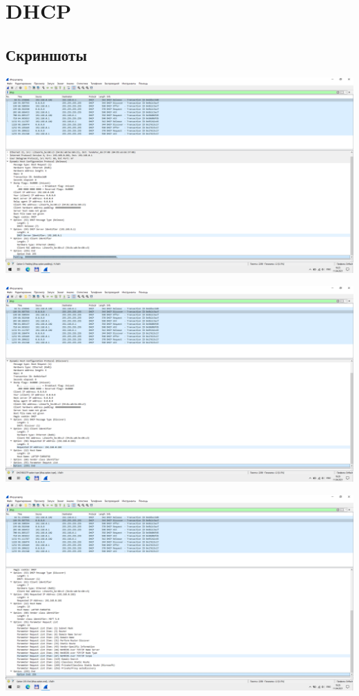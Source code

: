 
\section{DHCP}

\subsection{Скриншоты}

\begin{center}

    \includegraphics[width=\textwidth]{screenshots/dhcp_release_1}

    \includegraphics[width=\textwidth]{screenshots/dhcp_discover_1}

    \includegraphics[width=\textwidth]{screenshots/dhcp_discover_2}


\end{center}
